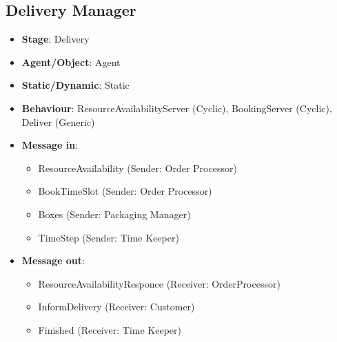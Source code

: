 \documentclass[12pt]{article}
\begin{document}
\subsection{Delivery Manager}%
\label{sub:delivery_manager}
\begin{itemize}
    \item \textbf{Stage}: Delivery
    \item \textbf{Agent/Object}: Agent
    \item \textbf{Static/Dynamic}: Static
    \item \textbf{Behaviour}: ResourceAvailabilityServer (Cyclic), BookingServer (Cyclic), Deliver (Generic)
    \item \textbf{Message in}:
        \begin{itemize}
            \item ResourceAvailability (Sender: Order Processor)
            \item BookTimeSlot (Sender: Order Processor)
            \item Boxes (Sender: Packaging Manager)
            \item TimeStep (Sender: Time Keeper)
        \end{itemize}
    \item \textbf{Message out}:
        \begin{itemize}
            \item ResourceAvailabilityResponce (Receiver: OrderProcessor)
            \item InformDelivery (Receiver: Customer)
            \item Finished (Receiver: Time Keeper)
        \end{itemize}
\end{itemize}

\newpage{}
\end{document}
